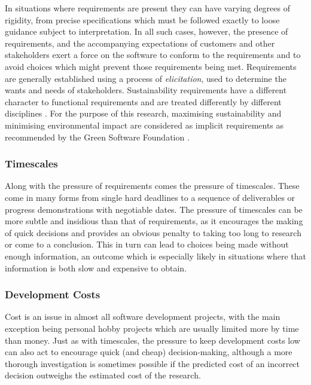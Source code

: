In situations where requirements are present they can have varying degrees of rigidity, from precise specifications which must be followed exactly to loose guidance subject to interpretation. In all such cases, however, the presence of requirements, and the accompanying expectations of customers and other stakeholders exert a force on the software to conform to the requirements and to avoid choices which might prevent those requirements being met. Requirements are generally established using a process of \emph{elicitation}, used to determine the wants and needs of stakeholders. Sustainability requirements have a different character to functional requirements and are treated differently by different disciplines \citep{Venters2017a}. For the purpose of this research, maximising sustainability and minimising environmental impact are considered as implicit requirements as recommended by the Green Software Foundation \citep{GreenSoftwareFioundation2024}.

\subsubsection{Timescales}

Along with the pressure of requirements comes the pressure of timescales. These come in many forms from single hard deadlines to a sequence of deliverables or progress demonstrations with negotiable dates. The pressure of timescales can be more subtle and insidious than that of requirements, as it encourages the making of quick decisions and provides an obvious penalty to taking too long to research or come to a conclusion. This in turn can lead to choices being made without enough information, an outcome which is especially likely in situations where that information is both slow and expensive to obtain.

\subsubsection{Development Costs}

Cost is an issue in almost all software development projects, with the main exception being personal hobby projects which are usually limited more by time than money. Just as with timescales, the pressure to keep development costs low can also act to encourage quick (and cheap) decision-making, although a more thorough investigation is sometimes possible if the predicted cost of an incorrect decision outweighs the estimated cost of the research.

